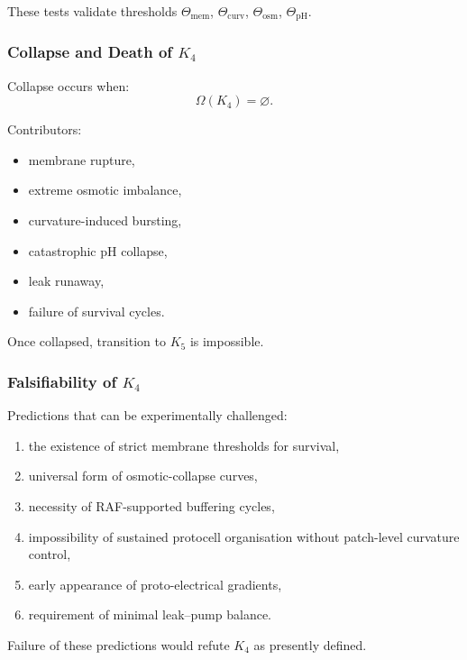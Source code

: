 These tests validate thresholds $\Theta_{\mathrm{mem}}$,
$\Theta_{\mathrm{curv}}$, $\Theta_{\mathrm{osm}}$,
$\Theta_{\mathrm{pH}}$.

\subsubsection{Collapse and Death of \texorpdfstring{$K_4$}{K_4}}

Collapse occurs when:
\[
\Omega(K_4) = \varnothing.
\]

Contributors:
\begin{itemize}
    \item membrane rupture,
    \item extreme osmotic imbalance,
    \item curvature-induced bursting,
    \item catastrophic pH collapse,
    \item leak runaway,
    \item failure of survival cycles.
\end{itemize}

Once collapsed, transition to $K_5$ is impossible.

\subsubsection{Falsifiability of \texorpdfstring{$K_4$}{K_4}}

Predictions that can be experimentally challenged:
\begin{enumerate}
    \item the existence of strict membrane thresholds for survival,
    \item universal form of osmotic-collapse curves,
    \item necessity of RAF-supported buffering cycles,
    \item impossibility of sustained protocell organisation without
          patch-level curvature control,
    \item early appearance of proto-electrical gradients,
    \item requirement of minimal leak–pump balance.
\end{enumerate}

Failure of these predictions would refute $K_4$ as presently defined.

